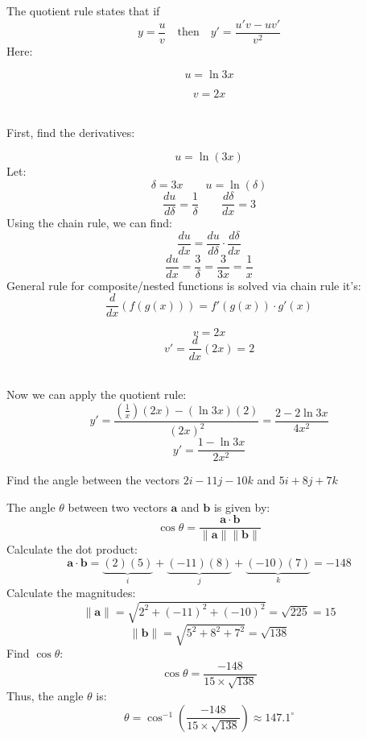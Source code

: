 \documentclass[a4paper, 12pt]{report}
\begin{document}
    The quotient rule states that if
    \[y = \frac{u}{v} \quad \text{then} \quad y' = \frac{u'v - uv'}{v^2}\]
    Here: \\[5pt]
    \begin{minipage}{0.4\textwidth}
        \[u = \ln 3x\] 
    \end{minipage}\hspace{-8em}
    \begin{minipage}{0.4\textwidth}
        \[v = 2x \]
    \end{minipage}\\[20pt]
    First, find the derivatives:\\[10pt]
    \begin{minipage}{0.43\textwidth}\centering
    \[u = \ln(3x)\]
    Let:
    \[\delta = 3x \qquad u = \ln(\delta)\]
    \[\frac{du}{d\delta} = \frac{1}{\delta} \qquad \frac{d\delta}{dx} = 3\]
    Using the chain rule, we can find:
    \[\frac{du}{dx} = \frac{du}{d\delta} \cdot \frac{d\delta}{dx}\]
    \[\frac{du}{dx} = \frac{3}{\delta} = \frac{3}{3x}= \frac{1}{x}\]
    General rule for composite/nested functions is solved via chain rule it's:
    \[\frac{d}{dx}(f(g(x))) = f'(g(x))\cdot g'(x)\]
    \end{minipage}\hspace{1em}\vrule\hspace{-2.5em}
    \begin{minipage}{0.4\textwidth}
        \[v = 2x\]
        \[v' = \frac{d}{dx}(2x) = 2\]
    \end{minipage}\\[30pt]
    Now we can apply the quotient rule:
    \[y' = \frac{\left(\frac{1}{x}\right)(2x) - (\ln 3x)(2)}{(2x)^2} = \frac{2 - 2\ln 3x}{4x^2}\]
    \[\boxed{y' = \frac{1 - \ln 3x}{2x^2}}\]
    
    \newpage
    \begin{tcolorbox}[title=\color{black}{\section{Q2}}, colback=white, colframe=black!30!white, boxrule=0.4mm, width=1\textwidth]
        Find the angle between the vectors \( 2 i-11 j-10 k \) and \( 5 i+8 j+7 k \)
    \end{tcolorbox}
    
    The angle \( \theta \) between two vectors \(\mathbf{a}\) and \(\mathbf{b}\) is given by:
    \[\cos \theta = \frac{\mathbf{a} \cdot \mathbf{b}}{\|\mathbf{a}\| \|\mathbf{b}\|}\]
    Calculate the dot product:
    \[\mathbf{a} \cdot \mathbf{b} = \underbrace{(2)(5)}_i + \underbrace{(-11)(8)}_j + \underbrace{(-10)(7)}_k = -148\]
    Calculate the magnitudes:
    \[\|\mathbf{a}\| = \sqrt{2^2 + (-11)^2 + (-10)^2} = \sqrt{225} = 15\]
    \[\|\mathbf{b}\| = \sqrt{5^2 + 8^2 + 7^2} = \sqrt{138}\]
    Find \(\cos \theta\):
    \[\cos \theta = \frac{-148}{15 \times \sqrt{138}}\]
    Thus, the angle \(\theta\) is:
    \[\boxed{\theta = \cos^{-1}\left(\frac{-148}{15 \times \sqrt{138}}\right) \approx 147.1^{\circ}}\]
    
\end{document}

